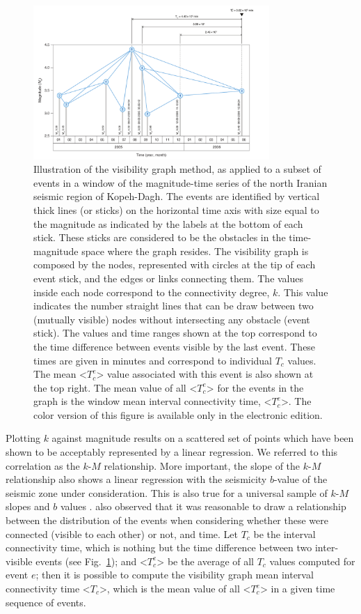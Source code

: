 \begin{figure}[t]
	\centering
	\includegraphics[width=0.8\textwidth]{figures/pdf/figure-01} 
	\caption{Illustration of the visibility graph method, as applied to a subset of events in a window of the magnitude-time series of the north Iranian seismic region of Kopeh-Dagh. The events are identified by vertical thick lines (or sticks) on the horizontal time axis with size equal to the magnitude as indicated by the labels at the bottom of each stick. These sticks are considered to be the obstacles in the time-magnitude space where the graph resides. The visibility graph is composed by the nodes, represented with circles at the tip of each event stick, and the edges or links connecting them. The values inside each node correspond to the connectivity degree, $k$. This value indicates the number straight lines that can be draw between two (mutually visible) nodes without intersecting any obstacle (event stick). The values and time ranges shown at the top correspond to the time difference between events visible by the last event. These times are given in minutes and correspond to individual $T_c$ values. The mean <$T_c^e$> value associated with this event is also shown at the top right. The mean value of all <$T_c^e$> for the events in the graph is the window mean interval connectivity time, <$T_c^e$>. The color version of this figure is available only in the electronic edition.}
	\label{fig:vg}
\end{figure}

Plotting $k$ against magnitude results on a scattered set of points which have been shown to be acceptably represented by a linear regression. We referred to this correlation as the $k$-$M$ relationship. More important, the slope of the $k$-$M$ relationship also shows a linear regression with the seismicity $b$-value of the seismic zone under consideration. This is also true for a universal sample of $k$-$M$ slopes and $b$ values \citep{Telesca2013, Telesca2014}. \citet{Telesca2014} also observed that it was reasonable to draw a relationship between the distribution of the events when considering whether these were connected (visible to each other) or not, and time. Let $T_c$ be the interval connectivity time, which is nothing but the time difference between two inter-visible events (see Fig.~\ref{fig:vg}); and <$T_c^e$> be the average of all $T_c$ values computed for event $e$; then it is possible to compute the visibility graph mean interval connectivity time <$T_c$>, which is the mean value of all <$T_c^e$> in a given time sequence of events.

